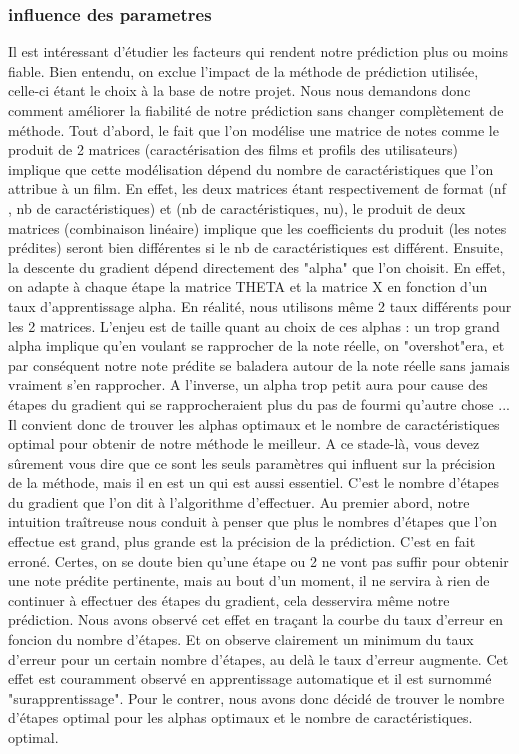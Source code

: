 \documentclass[a4paper,10pt]{article}
\begin{document}
\subsubsection{influence des parametres}
Il est intéressant d'étudier les facteurs qui rendent notre prédiction plus ou moins fiable. Bien entendu, on exclue l'impact de la méthode de prédiction utilisée, celle-ci étant le choix à la base de notre projet. Nous nous demandons donc comment améliorer la fiabilité de notre prédiction sans changer complètement de méthode. Tout d'abord, le fait que l'on modélise une matrice de notes comme le produit de 2 matrices (caractérisation des films et profils des utilisateurs) implique que cette modélisation dépend du nombre de caractéristiques que l'on attribue à un film. En effet, les deux matrices étant respectivement de format (nf , nb de caractéristiques) et (nb de caractéristiques, nu), le produit de deux matrices (combinaison linéaire) implique que les coefficients du produit (les notes prédites) seront bien différentes si le nb de caractéristiques est différent. Ensuite, la descente du gradient dépend directement des "alpha" que l'on choisit. En effet, on adapte à chaque étape la matrice THETA et la matrice X en fonction d'un taux d'apprentissage alpha. En réalité, nous utilisons même 2 taux différents pour les 2 matrices. L'enjeu est de taille quant au choix de ces alphas : un trop grand alpha implique qu'en voulant se rapprocher de la note réelle, on "overshot"era, et par conséquent notre note prédite se baladera autour de la note réelle sans jamais vraiment s'en rapprocher. A l'inverse, un alpha trop petit aura pour cause des étapes du gradient qui se rapprocheraient plus du pas de fourmi qu'autre chose ... Il convient donc de trouver les alphas optimaux et le nombre de caractéristiques optimal pour obtenir de notre méthode le meilleur. A ce stade-là, vous devez sûrement vous dire que ce sont les seuls paramètres qui influent sur la précision de la méthode, mais il en est un qui est aussi essentiel. C'est le nombre d'étapes du gradient que l'on dit à l'algorithme d'effectuer. Au premier abord, notre intuition traîtreuse nous conduit à penser que plus le nombres d'étapes que l'on effectue est grand, plus grande est la précision de la prédiction. C'est en fait erroné. Certes, on se doute bien qu'une étape ou 2 ne vont pas suffir pour obtenir une note prédite pertinente, mais au bout d'un moment, il ne servira à rien de continuer à effectuer des étapes du gradient, cela desservira même notre prédiction. Nous avons observé cet effet en traçant la courbe du taux d'erreur en foncion du nombre d'étapes. Et on observe clairement un minimum du taux d'erreur pour un certain nombre d'étapes, au delà le taux d'erreur augmente. Cet effet est couramment observé en apprentissage automatique et il est surnommé "surapprentissage". Pour le contrer, nous avons donc décidé de trouver le nombre d'étapes optimal pour les alphas optimaux et le nombre de caractéristiques. optimal.
\end{document}
